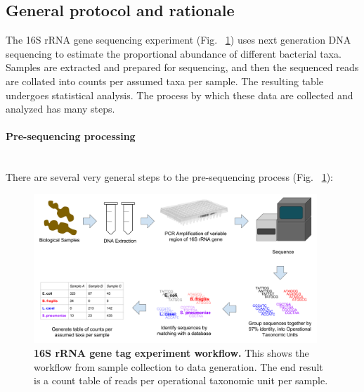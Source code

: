\subsection{General protocol and rationale}\label{sequencing_intro}
The 16S rRNA gene sequencing experiment (Fig. ~\ref{16s_workflow}) uses next generation DNA sequencing to estimate the proportional abundance of different bacterial taxa. Samples are extracted and prepared for sequencing, and then the sequenced reads are collated into counts per assumed taxa per sample. The resulting table undergoes statistical analysis. The process by which these data are collected and analyzed has many steps.

\paragraph{Pre-sequencing processing}\mbox{}\\
There are several very general steps to the pre-sequencing process (Fig. ~\ref{16s_workflow}):

\begin{figure}[h]
\begin{center}
\includegraphics[width=0.95\textwidth]{16S_rRNA_pipeline.png}
\caption[16S rRNA gene tag experiment workflow.]{\textbf{16S rRNA gene tag experiment workflow.} This shows the workflow from sample collection to data generation. The end result is a count table of reads per operational taxonomic unit per sample.}
\label{16s_workflow}
\end{center}
\end{figure}

